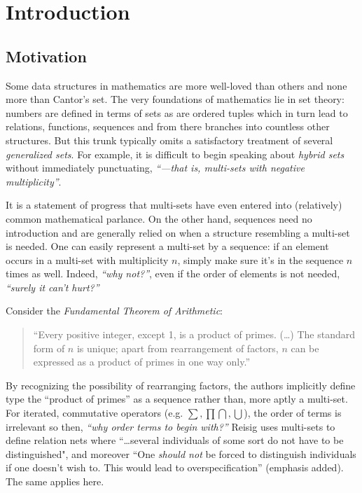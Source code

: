 \chapter{Introduction}
\doublespacing


\section{Motivation}


Some data structures in mathematics are more well-loved than others and none more than Cantor's set.
The very foundations of mathematics lie in set theory: numbers are defined in terms of sets as are ordered tuples 
which in turn lead to relations, functions, sequences and from there branches into countless other structures.
But this trunk typically omits a satisfactory treatment of several \emph{generalized sets}.
For example, it is difficult to begin speaking about \emph{hybrid sets} without immediately punctuating, 
\emph{``---that is, multi-sets with negative multiplicity''}.


It is a statement of progress that multi-sets have even entered into (relatively) common mathematical parlance.
On the other hand, sequences need no introduction and are generally relied on when a structure resembling a 
multi-set is needed.
One can easily represent a multi-set by a sequence: if an element occurs in a multi-set with multiplicity $n$, simply make
sure it's in the sequence $n$ times as well.
Indeed,  \emph{``why not?''}, even if the order of elements is not needed, \emph{``surely it can't hurt?''}


Consider the \emph{Fundamental Theorem of Arithmetic}:
\begin{quote}
	``Every positive integer, except 1, is a product of primes. 
	(\ldots) 
	The standard form of $n$ is unique; 
	apart from rearrangement of factors, $n$ can be expressed as a product of primes in one way only.''
\end{quote}
By recognizing the possibility of rearranging factors, the authors implicitly define type the ``product of primes'' as a sequence rather than, more aptly a multi-set.
For iterated, commutative operators (e.g. $\sum, \prod \bigcap, \bigcup$), the order of terms is irrelevant so then, 
\emph{``why order terms to begin with?''}
Reisig \cite{reisig1985petri} uses multi-sets to define relation nets where 
``\ldots several individuals of some sort do not have to be distinguished", and moreover
 ``One \emph{should not} be forced to distinguish individuals if one doesn't wish to.  This would lead to overspecification''
(emphasis added). The same applies here.


